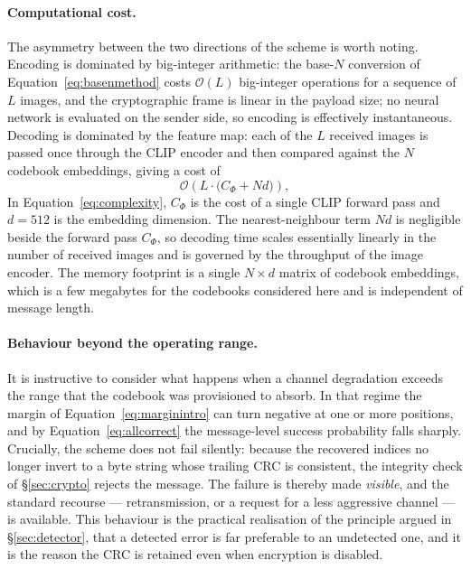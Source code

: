\documentclass[11pt]{article}
\theoremstyle{definition}
\newcommand{\Eqn}[1]{Equation~\eqref{#1}}
\begin{document}
\paragraph{Computational cost.}
The asymmetry between the two directions of the scheme is worth noting. Encoding is
dominated by big-integer arithmetic: the base-$N$ conversion of \Eqn{eq:basenmethod}
costs $\mathcal{O}(L)$ big-integer operations for a sequence of $L$ images, and the
cryptographic frame is linear in the payload size; no neural network is evaluated on
the sender side, so encoding is effectively instantaneous. Decoding is dominated by
the feature map: each of the $L$ received images is passed once through the CLIP
encoder and then compared against the $N$ codebook embeddings, giving a cost of
\begin{equation}
  \mathcal{O}\!\left(L\cdot\bigl(C_\Phi + N d\bigr)\right),
  \label{eq:complexity}
\end{equation}
In \Eqn{eq:complexity}, $C_\Phi$ is the cost of a single CLIP forward pass and
$d=512$ is the
embedding dimension. The nearest-neighbour term $Nd$ is negligible beside the
forward pass $C_\Phi$, so decoding time scales essentially linearly in the number
of received images and is governed by the throughput of the image encoder. The
memory footprint is a single $N\times d$ matrix of codebook embeddings, which is a
few megabytes for the codebooks considered here and is independent of message
length.

\paragraph{Behaviour beyond the operating range.}
It is instructive to consider what happens when a channel degradation exceeds the
range that the codebook was provisioned to absorb. In that regime the margin of
\Eqn{eq:marginintro} can turn negative at one or more positions, and by
\Eqn{eq:allcorrect} the message-level success probability falls sharply. Crucially,
the scheme does not fail silently: because the recovered indices no longer invert to
a byte string whose trailing CRC is consistent, the integrity check of
\S\ref{sec:crypto} rejects the message. The failure is thereby made \emph{visible},
and the standard recourse --- retransmission, or a request for a less aggressive
channel --- is available. This behaviour is the practical realisation of the
principle argued in \S\ref{sec:detector}, that a detected error is far preferable to
an undetected one, and it is the reason the CRC is retained even when encryption is
disabled.
\end{document}
